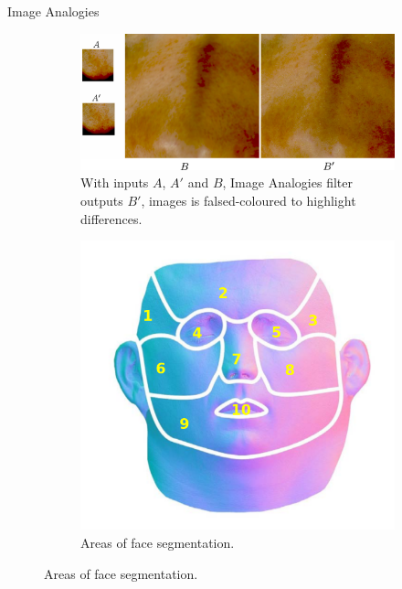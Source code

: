 \documentclass{beamer}
\begin{document}
\begin{frame}{Image Analogies}

\begin{figure}
        \centering
        \begin{subfigure}[b]{0.65\textwidth}
                \includegraphics[width=\textwidth]{img/texture_synthesis}
                \caption{With inputs $A$, $A'$ and $B$, Image Analogies filter outputs $B'$, images is falsed-coloured to highlight differences.}
        \end{subfigure}
        \begin{subfigure}[b]{0.25\textwidth}
                \includegraphics[width=\textwidth]{img/texture_synthesis_parts}
                \caption{Areas of face segmentation.}
        \end{subfigure}
\end{figure}

\end{frame}
\end{document}
